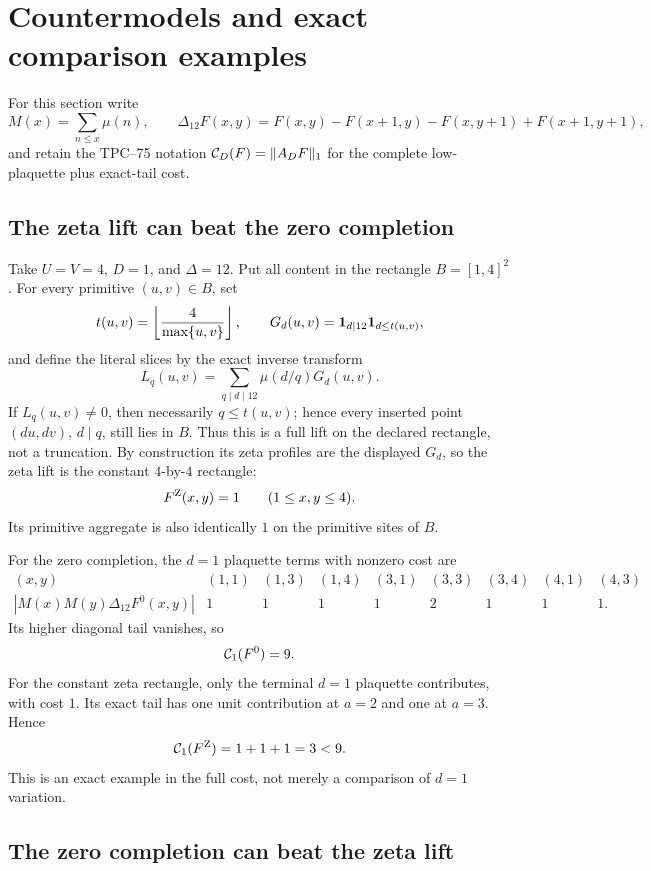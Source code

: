 \section{Countermodels and exact comparison examples}
\label{sec:countermodels}

For this section write
\[
 M(x)=\sum_{n\le x}\mu(n),\qquad
 \Delta_{12}F(x,y)
 =
 F(x,y)-F(x+1,y)-F(x,y+1)+F(x+1,y+1),
\]
and retain the TPC--75 notation
\(\mathcal C_D(F)=\|A_DF\|_1\) for the complete low-plaquette plus exact-tail
cost.

\subsection{The zeta lift can beat the zero completion}

Take \(U=V=4\), \(D=1\), and \(\Delta=12\).  Put all content in the
rectangle \(B=[1,4]^2\).  For every primitive
\((u,v)\in B\), set
\[
 t(u,v)=\left\lfloor\frac4{\max\{u,v\}}\right\rfloor,
 \qquad
 G_d(u,v)=\mathbf 1_{d\mid12}\mathbf 1_{d\le t(u,v)},
\]
and define the literal slices by the exact inverse transform
\[
 L_q(u,v)
 =
 \sum_{q\mid d\mid12}\mu(d/q)G_d(u,v).
\]
If \(L_q(u,v)\ne0\), then necessarily \(q\le t(u,v)\); hence every
inserted point \((du,dv)\), \(d\mid q\), still lies in \(B\).
Thus this is a full lift on the declared rectangle, not a truncation.
By construction its zeta profiles are the displayed \(G_d\), so the
zeta lift is the constant \(4\)-by-\(4\) rectangle:
\[
 F^{\rm Z}(x,y)=1
 \qquad(1\le x,y\le4).
\]
Its primitive aggregate is also identically \(1\) on the primitive
sites of \(B\).

For the zero completion, the \(d=1\) plaquette terms with nonzero cost
are
\[
\begin{array}{c|cccccccc}
(x,y)&(1,1)&(1,3)&(1,4)&(3,1)&(3,3)&(3,4)&(4,1)&(4,3)\\
\hline
|M(x)M(y)\Delta_{12}F^0(x,y)|
&1&1&1&1&2&1&1&1.
\end{array}
\]
Its higher diagonal tail vanishes, so
\[
 \mathcal C_1(F^0)=9.
\]
For the constant zeta rectangle, only the terminal \(d=1\) plaquette
contributes, with cost \(1\).  Its exact tail has one unit contribution
at \(a=2\) and one at \(a=3\).  Hence
\[
 \mathcal C_1(F^{\rm Z})=1+1+1=3<9.
\]
This is an exact example in the full cost, not merely a comparison of
\(d=1\) variation.

\subsection{The zero completion can beat the zeta lift}

